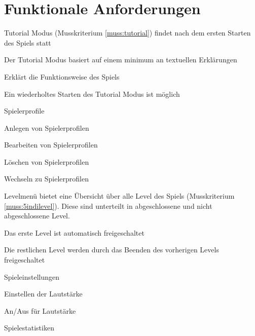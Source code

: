 \documentclass{scrartcl}
\begin{document}
\clearpage









\section{Funktionale Anforderungen}

\begin{falist}
	\item Tutorial Modus (Musskriterium \ref{muss:tutorial}) findet nach dem ersten Starten des Spiels statt
	\begin{falist}
        \item Der Tutorial Modus basiert auf einem minimum an textuellen Erklärungen
        \item Erklärt die Funktionsweise des Spiels
		\item Ein wiederholtes Starten des Tutorial Modus ist möglich
	\end{falist}
	\item Spielerprofile
	\begin{falist}
		\item Anlegen von Spielerprofilen
		\item Bearbeiten von Spielerprofilen
		\item Löschen von Spielerprofilen
		\item Wechseln zu Spielerprofilen
	\end{falist}
	\item Levelmenü bietet eine Übersicht über alle Level des Spiels (Musskriterium \ref{muss:5indilevel}). Diese sind unterteilt in abgeschlossene und nicht abgeschlossene Level.
    \begin{falist}
        \item Das erste Level ist automatisch freigeschaltet
        \item Die restlichen Level werden durch das Beenden des vorherigen Levels freigeschaltet
    \end{falist}
	\item Spieleinstellungen
	\begin{falist}
		\item Einstellen der Lautstärke
		\item An/Aus für Lautstärke
	\end{falist}
	\item Spielestatistiken
	\begin{falist}

\end{falist}
\end{falist}
\end{document}
